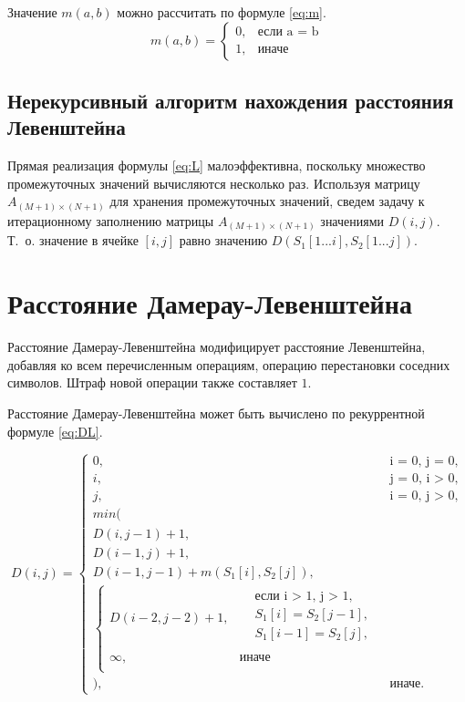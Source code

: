 Значение $ m(a, b) $ можно рассчитать по формуле \eqref{eq:m}.
\begin{equation}
	\label{eq:m}
	m(a, b) = \begin{cases}
		0, &\text{если a = b}\\
		1, &\text{иначе}
	\end{cases}
\end{equation}

\subsection{Нерекурсивный алгоритм нахождения расстояния Левенштейна}

Прямая реализация формулы \eqref{eq:L} малоэффективна, поскольку множество промежуточных значений вычисляются несколько раз. Используя матрицу $ A_{(M+1) \times (N+1)} $ для хранения промежуточных значений, сведем задачу к итерационному заполнению матрицы $ A_{(M+1) \times (N+1)} $ значениями $ D(i, j) $. Т.~о. значение в ячейке $ [i, j] $ равно значению $ D(S_1[1...i], S_2[1...j]) $.

\section{Расстояние Дамерау-Левенштейна}

Расстояние Дамерау-Левенштейна модифицирует расстояние Левенштейна, добавляя ко всем перечисленным операциям, операцию перестановки соседних символов. Штраф новой операции также составляет $ 1 $. 

Расстояние Дамерау-Левенштейна может быть вычислено по рекуррентной формуле \eqref{eq:DL}.

\begin{equation}
	\label{eq:DL}
	D(i, j) = 
	\begin{cases}
		0, &\text{i = 0, j = 0,}\\
		i, &\text{j = 0, i > 0,}\\
		j, &\text{i = 0, j > 0,}\\
		min(\\
			D(i, j - 1) + 1,\\
			D(i - 1, j) + 1,\\ 
			D(i - 1, j - 1) + m(S_{1}[i], S_{2}[j]), \\
			\begin{cases}
				D(i - 2, j - 2) + 1, & \begin{aligned}
					& \text{если i > 1, j > 1}, \\
					& S_{1}[i] = S_{2}[j - 1], \\
					& S_{1}[i - 1] = S_{2}[j], \\
				\end{aligned}\\
				\infty, & \textrm{иначе} \\
			\end{cases} \\
		), & \textrm{иначе.}
	\end{cases}
\end{equation}

